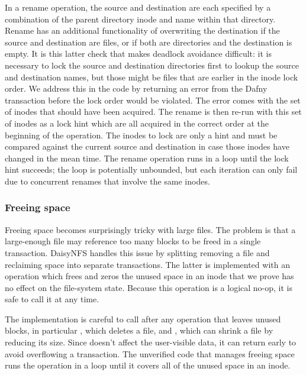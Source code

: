 In a rename operation, the source and destination are each specified by a
combination of the parent directory inode and name within that directory. Rename
has an additional functionality of overwriting the destination if the source and
destination are files, or if both are directories and the destination is empty.
It is this latter check that makes deadlock avoidance difficult: it is necessary
to lock the source and destination directories first to lookup the source and
destination names, but those might be files that are earlier in the inode lock
order. We address this in the code by returning an error from the Dafny
transaction before the lock order would be violated. The error comes with the
set of inodes that should have been acquired.  The rename is then re-run with
this set of inodes as a lock hint which are all acquired in the correct
order at the beginning of the operation. The inodes to lock are only a hint and must be compared
against the current source and destination in case those inodes have changed in
the mean time. The rename operation runs in a loop until the lock hint succeeds;
the loop is potentially unbounded, but each iteration can only fail due to
concurrent renames that involve the same inodes.

\subsubsection{Freeing space}
\label{sec:dafny:freeing}

Freeing space becomes surprisingly tricky with large files. The problem is that
a large-enough file may reference too many blocks to be
freed in a single transaction.
DaisyNFS handles this issue by splitting removing a file and reclaiming space
into separate transactions. The latter is implemented with an operation
 which frees and zeros the unused space in an inode that
we prove has no effect on the file-system state. Because this operation is a
logical no-op, it is safe to call it at any time.

The implementation is careful to call  after any operation
that leaves unused blocks, in particular , which deletes a file, and
, which can shrink a file by reducing its size. Since
 doesn't affect the user-visible data, it can return early to
avoid overflowing a transaction. The unverified code that manages freeing space
runs the operation in a loop until it covers all of the unused space in an
inode.

